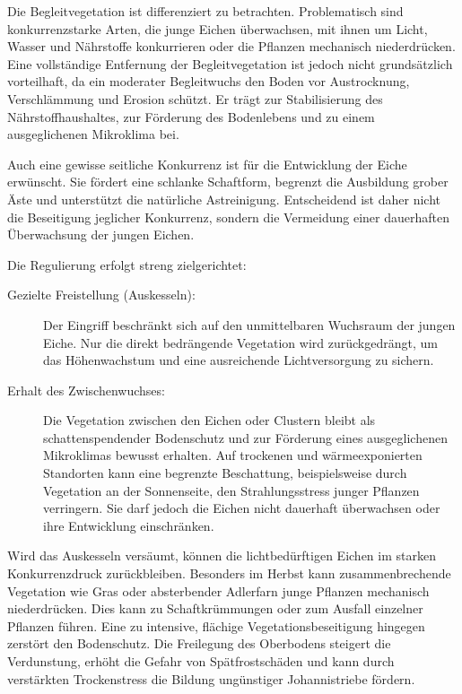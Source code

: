 \documentclass[twocolumn, bibliography=totoc, abstract=true]{scrartcl}
\begin{document}
Die Begleitvegetation ist differenziert zu betrachten. Problematisch sind konkurrenzstarke Arten, die junge Eichen überwachsen, mit ihnen um Licht, Wasser und Nährstoffe konkurrieren oder die Pflanzen mechanisch niederdrücken. Eine vollständige Entfernung der Begleitvegetation ist jedoch nicht grundsätzlich vorteilhaft, da ein moderater Begleitwuchs den Boden vor Austrocknung, Verschlämmung und Erosion schützt. Er trägt zur Stabilisierung des Nährstoffhaushaltes, zur Förderung des Bodenlebens und zu einem ausgeglichenen Mikroklima bei.

Auch eine gewisse seitliche Konkurrenz ist für die Entwicklung der Eiche erwünscht. Sie fördert eine schlanke Schaftform, begrenzt die Ausbildung grober Äste und unterstützt die natürliche Astreinigung. Entscheidend ist daher nicht die Beseitigung jeglicher Konkurrenz, sondern die Vermeidung einer dauerhaften Überwachsung der jungen Eichen.

Die Regulierung erfolgt streng zielgerichtet:

\begin{description}
\item[Gezielte Freistellung (Auskesseln):] Der Eingriff beschränkt sich auf den unmittelbaren Wuchsraum der jungen Eiche. Nur die direkt bedrängende Vegetation wird zurückgedrängt, um das Höhenwachstum und eine ausreichende Lichtversorgung zu sichern.
\item[Erhalt des Zwischenwuchses:] Die Vegetation zwischen den Eichen oder Clustern bleibt als schattenspendender Bodenschutz und zur Förderung eines ausgeglichenen Mikroklimas bewusst erhalten. Auf trockenen und wärmeexponierten Standorten kann eine begrenzte Beschattung, beispielsweise durch Vegetation an der Sonnenseite, den Strahlungsstress junger Pflanzen verringern. Sie darf jedoch die Eichen nicht dauerhaft überwachsen oder ihre Entwicklung einschränken.
\end{description}

Wird das Auskesseln versäumt, können die lichtbedürftigen Eichen im starken Konkurrenzdruck zurückbleiben. Besonders im Herbst kann zusammenbrechende Vegetation wie Gras oder absterbender Adlerfarn junge Pflanzen mechanisch niederdrücken. Dies kann zu Schaftkrümmungen oder zum Ausfall einzelner Pflanzen führen. Eine zu intensive, flächige Vegetationsbeseitigung hingegen zerstört den Bodenschutz. Die Freilegung des Oberbodens steigert die Verdunstung, erhöht die Gefahr von Spätfrostschäden und kann durch verstärkten Trockenstress die Bildung ungünstiger Johannistriebe fördern.
\end{document}
